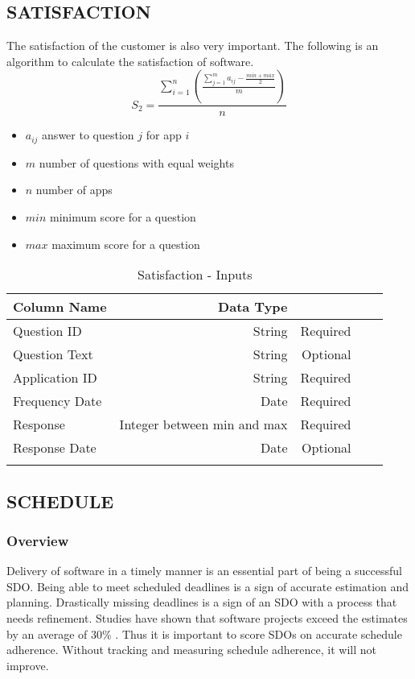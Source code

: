 \documentclass[SDSUThesis.tex]{subfiles}
\begin{document}
\subsection{SATISFACTION}
The satisfaction of the customer is also very important.  The following is an algorithm to calculate the satisfaction of software.
\[
    S_2 = \frac{\sum^n_{i=1}\left( \frac{\sum^m_{j=1}a_{ij}- \frac{min + max}{2}}{m}  \right)}{n}
\]

\begin{itemize}
\item $a_{i j}$ answer to question $j$ for app $i$
\item $m$ number of questions with equal weights
\item $n$ number of apps
\item $min$ minimum score for a question
\item $max$ maximum score for a question
\end{itemize}

\begin{longtable}{@{}l rr rr}

\toprule%
 \centering%
 {\bfseries Column Name}
 & {\bfseries Data Type}
 &  \\

\cmidrule[0.4pt](r{0.125em}){1-1}%
\cmidrule[0.4pt](lr{0.125em}){2-2}%
\cmidrule[0.4pt](l{0.125em}){3-3}%
\endhead

Question ID & String  & Required \\
\myrowcolour%
Question Text & String  & Optional \\
Application ID & String & Required \\
\myrowcolour%
Frequency Date & Date & Required \\
Response & Integer between min and max  & Required \\
\myrowcolour%
Response Date & Date & Optional \\

\bottomrule

\caption{Satisfaction - Inputs}
\label{tab:satisfaction}
\end{longtable}


\subsection{SCHEDULE}  

    \subsubsection{Overview}
        Delivery of software in a timely manner is an essential part of being a 
        successful SDO.  Being able to meet scheduled deadlines is a sign of accurate
        estimation and planning.  Drastically missing deadlines is a sign of an SDO
        with a process that needs refinement.  Studies have shown that 
        software projects exceed the estimates by an average of
        30\% \cite{Jorgensen2014}.  Thus it is important to score SDOs on accurate
        schedule adherence. Without tracking and measuring schedule adherence, it will
        not improve.  
        
\end{document}
